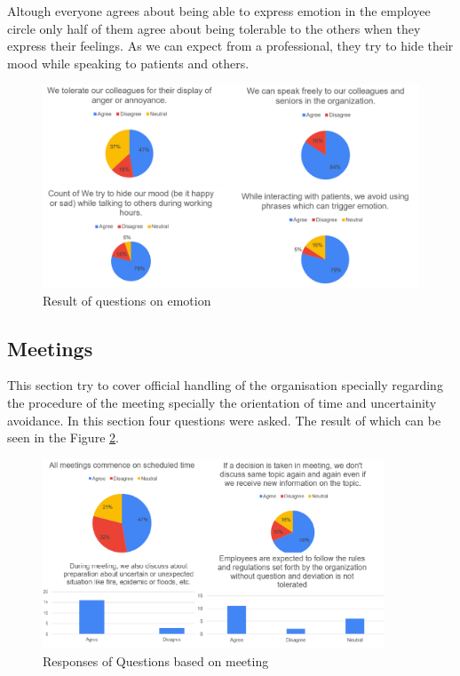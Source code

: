 \documentclass{article}
\begin{document}
Altough everyone agrees about being able to express emotion in the employee circle only half of them agree about being tolerable to the others when they express their feelings. As we can expect from a professional, they try to hide their mood while speaking to patients and others.

\begin{figure}
    \centering
    \includegraphics[width = 4.5 in]{Emotion.png}
    \caption{Result of questions on emotion}
    \label{Emotion}
\end{figure}

\subsection{Meetings}

This section try to cover official handling of the organisation specially regarding the procedure of the meeting specially the orientation of time and uncertainity avoidance. In this section four questions were asked. The result of which can be seen in the Figure \ref{meeting}.

\begin{figure}
    \begin{center}
        \includegraphics[width = 4in]{Meeting.png}
    \end{center}
    \caption{Responses of Questions based on meeting}
    \label{meeting}
\end{figure}
\end{document}
